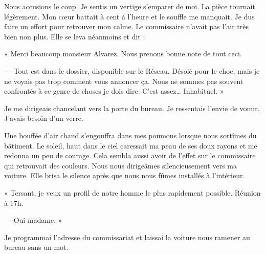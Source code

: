 Nous accusions le coup. Je sentis un vertige s'emparer de moi. La pièce tournait légèrement. Mon cœur battait à cent à 
l'heure et le souffle me manquait. Je dus faire un effort pour retrouver mon calme. Le commissaire n'avait pas l'air 
très bien non plus. Elle se leva néanmoins et dit :

« Merci beaucoup monsieur Alvarez. Nous prenons bonne note de tout ceci.

— Tout est dans le dossier, disponible sur le Réseau. Désolé pour le choc, mais je ne voyais pas trop comment vous 
annoncer ça. Nous ne sommes pas souvent confrontés à ce genre de choses je dois dire. C'est assez… Inhabituel. »

Je me dirigeais chancelant vers la porte du bureau. Je ressentais l'envie de vomir. J'avais besoin d'un verre.

Une bouffée d'air chaud s'engouffra dans mes poumons lorsque nous sortîmes du bâtiment. Le soleil, haut dans le ciel 
caressait ma peau de ses doux rayons et me redonna un peu de courage. Cela sembla aussi avoir de l'effet sur le 
commissaire qui retrouvait des couleurs. Nous nous dirigeâmes silencieusement vers ma voiture. Elle brisa le silence 
après que nous nous fûmes installés à l'intérieur.

« Tersant, je veux un profil de notre homme le plus rapidement possible. Réunion à 17h.

— Oui madame. »

Je programmai l'adresse du commissariat et laissai la voiture nous ramener au bureau sans un mot.
